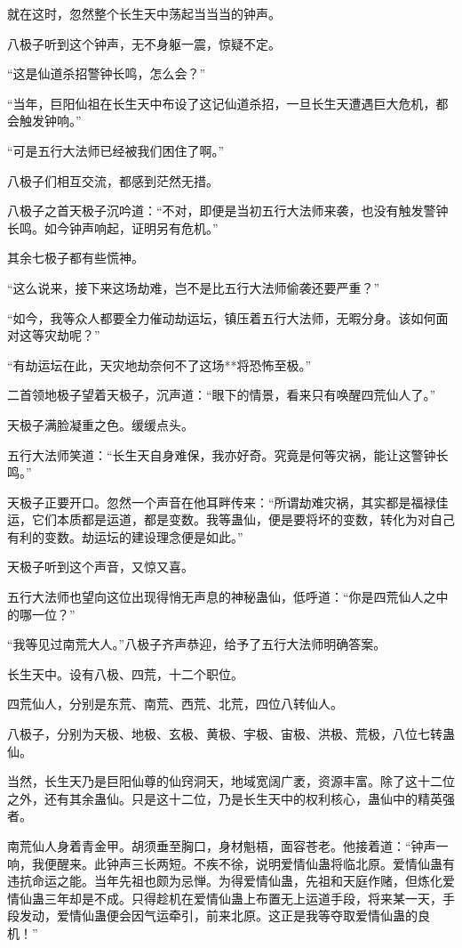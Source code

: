 \begin{this_body}
就在这时，忽然整个长生天中荡起当当当的钟声。

八极子听到这个钟声，无不身躯一震，惊疑不定。

“这是仙道杀招警钟长鸣，怎么会？”

“当年，巨阳仙祖在长生天中布设了这记仙道杀招，一旦长生天遭遇巨大危机，都会触发钟响。”

“可是五行大法师已经被我们困住了啊。”

八极子们相互交流，都感到茫然无措。

八极子之首天极子沉吟道：“不对，即便是当初五行大法师来袭，也没有触发警钟长鸣。如今钟声响起，证明另有危机。”

其余七极子都有些慌神。

“这么说来，接下来这场劫难，岂不是比五行大法师偷袭还要严重？”

“如今，我等众人都要全力催动劫运坛，镇压着五行大法师，无暇分身。该如何面对这等灾劫呢？”

“有劫运坛在此，天灾地劫奈何不了这场**将恐怖至极。”

二首领地极子望着天极子，沉声道：“眼下的情景，看来只有唤醒四荒仙人了。”

天极子满脸凝重之色。缓缓点头。

五行大法师笑道：“长生天自身难保，我亦好奇。究竟是何等灾祸，能让这警钟长鸣。”

天极子正要开口。忽然一个声音在他耳畔传来：“所谓劫难灾祸，其实都是福禄佳运，它们本质都是运道，都是变数。我等蛊仙，便是要将坏的变数，转化为对自己有利的变数。劫运坛的建设理念便是如此。”

天极子听到这个声音，又惊又喜。

五行大法师也望向这位出现得悄无声息的神秘蛊仙，低呼道：“你是四荒仙人之中的哪一位？”

“我等见过南荒大人。”八极子齐声恭迎，给予了五行大法师明确答案。

长生天中。设有八极、四荒，十二个职位。

四荒仙人，分别是东荒、南荒、西荒、北荒，四位八转仙人。

八极子，分别为天极、地极、玄极、黄极、宇极、宙极、洪极、荒极，八位七转蛊仙。

当然，长生天乃是巨阳仙尊的仙窍洞天，地域宽阔广袤，资源丰富。除了这十二位之外，还有其余蛊仙。只是这十二位，乃是长生天中的权利核心，蛊仙中的精英强者。

南荒仙人身着青金甲。胡须垂至胸口，身材魁梧，面容苍老。他接着道：“钟声一响，我便醒来。此钟声三长两短。不疾不徐，说明爱情仙蛊将临北原。爱情仙蛊有违抗命运之能。当年先祖也颇为忌惮。为得爱情仙蛊，先祖和天庭作赌，但炼化爱情仙蛊三年却是不成。只得趁机在爱情仙蛊上布置无上运道手段，将来某一天，手段发动，爱情仙蛊便会因气运牵引，前来北原。这正是我等夺取爱情仙蛊的良机！”


\end{this_body}
